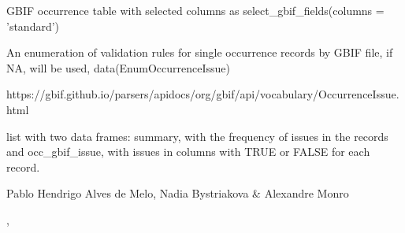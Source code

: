 \documentclass[a4paper]{book}
\begin{document}
%
\begin{Arguments}
\begin{ldescription}
\item[\code{occ}] GBIF occurrence table with selected columns as select\_gbif\_fields(columns = 'standard')

\item[\code{enumOccurrenceIssue}] An enumeration of validation rules for single occurrence records by GBIF file, if NA, will be used, data(EnumOccurrenceIssue)
\end{ldescription}
\end{Arguments}
%
\begin{Details}
https://gbif.github.io/parsers/apidocs/org/gbif/api/vocabulary/OccurrenceIssue.html
\end{Details}
%
\begin{Value}
list with two data frames: summary, with the frequency of issues in the records
and occ\_gbif\_issue, with issues in columns with TRUE or FALSE for each record.
\end{Value}
%
\begin{Author}
Pablo Hendrigo Alves de Melo,
Nadia Bystriakova \&
Alexandre Monro
\end{Author}
%
\begin{SeeAlso}
, 
\end{SeeAlso}
%
\begin{Examples}
\end{Examples}
\end{document}
